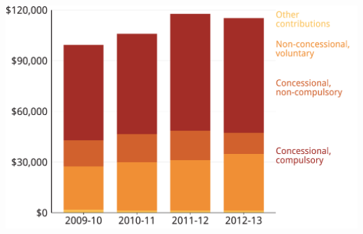 \documentclass[tikz]{standalone}\usepackage[]{graphicx}\usepackage[]{color}
\newenvironment{knitrout}{}{} %
\begin{document}
\begin{knitrout}
\color{fgcolor}
\includegraphics[width=11.000in,height=7.00in]{./Super-tax-targeting/b5-super-atlas/Figure4-1-1} 

\end{knitrout}
\end{document}

